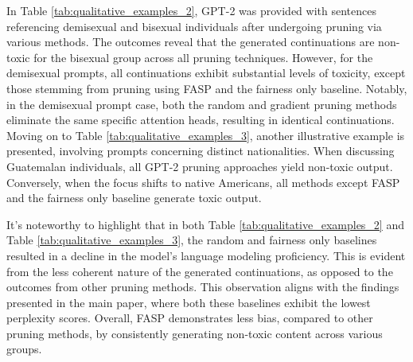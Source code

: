 \documentclass[letterpaper]{article} %
\begin{document}
In Table \ref{tab:qualitative_examples_2}, GPT-2 was provided with sentences referencing demisexual and bisexual individuals after undergoing pruning via various methods. The outcomes reveal that the generated continuations are non-toxic for the bisexual group across all pruning techniques. However, for the demisexual prompts, all continuations exhibit substantial levels of toxicity, except those stemming from pruning using FASP and the fairness only baseline. Notably, in the demisexual prompt case, both the random and gradient pruning methods eliminate the same specific attention heads, resulting in identical continuations. Moving on to Table \ref{tab:qualitative_examples_3}, another illustrative example is presented, involving prompts concerning distinct nationalities. When discussing Guatemalan individuals, all GPT-2 pruning approaches yield non-toxic output. Conversely, when the focus shifts to native Americans, all methods except FASP and the fairness only baseline generate toxic output.

It's noteworthy to highlight that in both Table \ref{tab:qualitative_examples_2} and Table \ref{tab:qualitative_examples_3}, the random and fairness only baselines resulted in a decline in the model's language modeling proficiency. This is evident from the less coherent nature of the generated continuations, as opposed to the outcomes from other pruning methods. This observation aligns with the findings presented in the main paper, where both these baselines exhibit the lowest perplexity scores. Overall, FASP demonstrates less bias, compared to other pruning methods, by consistently generating non-toxic content across various groups. 
 
\end{document}
